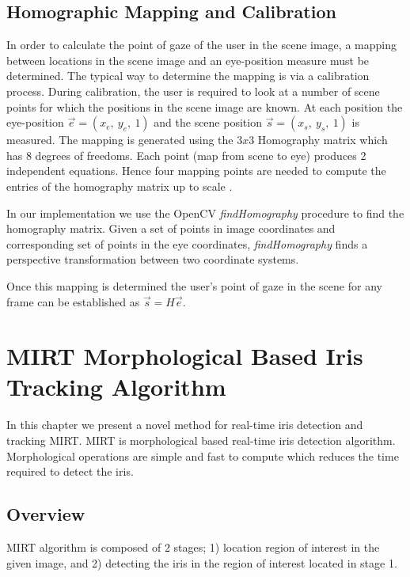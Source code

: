 \documentclass[12pt,fleqn]{book} %
\begin{document}
\section{Homographic Mapping and Calibration}
In order to calculate the point of gaze of the user in the scene image, a mapping between locations in the scene image and an eye-position measure must be determined. The typical way to determine the mapping is via a calibration process. During calibration, the user is required to look at a number of scene points for which the positions in the scene image are known. At each position the eye-position $\vec{e} = (x_{e} ,\: y_{e},\: 1)$ and the scene position $\vec{s} = (x_{s},\: y_{s},\: 1)$ is measured. The mapping is generated using the $3x3$ Homography matrix which has 8 degrees of freedoms. Each point (map from scene to eye) produces 2 independent equations. Hence four mapping points are needed to compute the entries of the homography matrix up to scale \cite{heuristic}. \bigskip

In our implementation we use the OpenCV \textit{findHomography} procedure to find the homography matrix. Given a set of points in image coordinates and corresponding set of points in the eye coordinates, \textit{findHomography} finds a perspective transformation between two coordinate systems. \bigskip

Once this mapping is determined the user’s point of gaze in the scene for any frame can be established
as $\vec{s} = H \vec{e}$.


\chapter{MIRT Morphological Based Iris Tracking Algorithm}
In this chapter we present a novel method for real-time iris detection and tracking MIRT. MIRT is morphological based real-time iris detection algorithm. Morphological operations are simple and fast to compute which reduces the time required to detect the iris.

\section{Overview}
MIRT algorithm is composed of 2 stages; 1) location region of interest in the given image, and 2) detecting the iris in the region of interest located in stage 1. 
\end{document}
